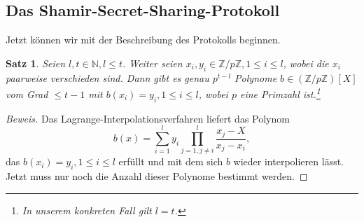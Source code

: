 \documentclass[12pt, a4paper, oneside, titlepage]{report}
\newcommand{\Z}{\mathds{Z}}
\newcommand{\N}{\mathds{N}}
\newtheorem{satz}[lemma]{Satz}
\newenvironment{bew}{\begin{proof}[Beweis]}{\end{proof}}
\theoremstyle{definition}
\begin{document}
	\subsection{Das Shamir-Secret-Sharing-Protokoll}
	Jetzt können wir mit der Beschreibung des Protokolls beginnen.
	
	\begin{satz}\label{multiple-polynoms-sentence}
		Seien $ l, t \in \N, l \leq t $. Weiter seien $ x_i, y_i \in \Z / p\Z, 1 \leq i \leq l $, wobei die $ x_i $ paarweise verschieden sind. Dann gibt es genau $ p^{t-l} $ Polynome $ b \in (\Z / p\Z)[X] $ vom Grad $ \leq t - 1 $ mit $ b(x_i) = y_i, 1 \leq i \leq l $, wobei $ p $ eine Primzahl ist.\footnote{In unserem konkreten Fall gilt $ l = t $.}
	\end{satz}
	\begin{bew}
		Das Lagrange-Interpolationsverfahren liefert das Polynom
		$$ b(x) = \sum_{i=1}^{l} y_i \prod_{j=1, j \neq i}^{l} \frac{x_j - X}{x_j - x_i}, $$
		das $ b(x_i) = y_i, 1 \leq i \leq l $ erfüllt und mit dem sich $ b $ wieder interpolieren lässt. Jetzt muss nur noch die Anzahl dieser Polynome bestimmt werden.
		

\end{bew}
\end{document}
